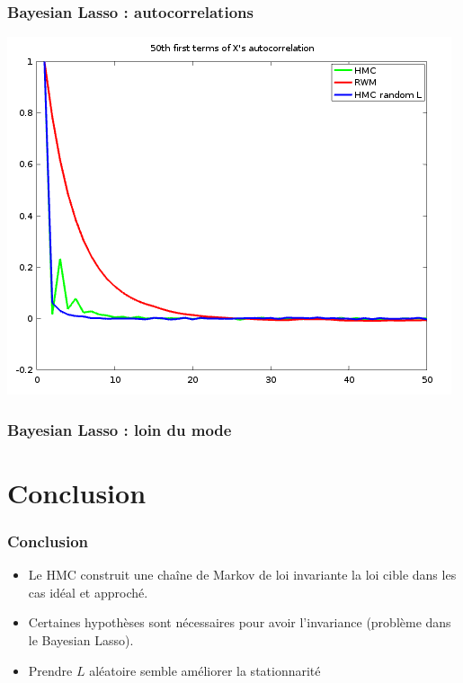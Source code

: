 \documentclass[10pt]{beamer}
\begin{document}
\begin{frame}
  \frametitle{Bayesian Lasso : autocorrelations}
\begin{center}
      \includegraphics[width=.8\textwidth]{figs/bl_autocor.png}
  \end{center}  
\end{frame}

\begin{frame}
  \frametitle{Bayesian Lasso : loin du mode}
\begin{center}
  \end{center}  
\end{frame}

\section{Conclusion}
\begin{frame}
  \frametitle{Conclusion}
  \begin{itemize}
  \item Le HMC construit une chaîne de Markov de loi invariante la loi cible dans les cas idéal et approché.
  \item Certaines hypothèses sont nécessaires pour avoir l'invariance (problème dans le Bayesian Lasso).
  \item Prendre $L$ aléatoire semble améliorer la stationnarité
  \end{itemize}
\end{frame}
\end{document}
